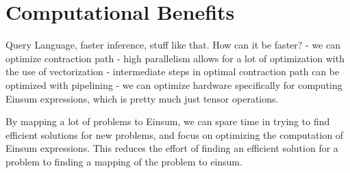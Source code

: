 \section{Computational Benefits}
\label{sec:einsum:comp_benefits}

Query Language, faster inference, stuff like that.
How can it be faster?
- we can optimize contraction path
- high parallelism allows for a lot of optimization with the use of vectorization
- intermediate steps in optimal contraction path can be optimized with pipelining
- we can optimize hardware specifically for computing Einsum expressions, which is pretty much just tensor operations.

By mapping a lot of problems to Einsum, we can spare time in trying to find efficient solutions for new problems,
and focus on optimizing the computation of Einsum expressions.
This reduces the effort of finding an efficient solution for a problem to finding a mapping of the problem to einsum.

\blindtext[2]